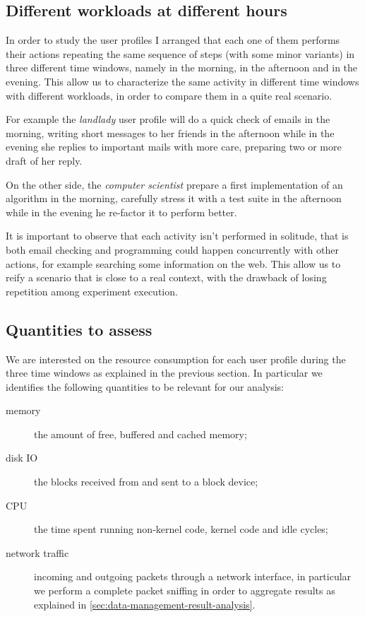 \documentclass[10pt,a4paper]{article}
\begin{document}
    \subsection{Different workloads at different hours}
    In order to study the user profiles I arranged that each one of
    them performs their actions repeating the same sequence of steps
    (with some minor variants) in three different time windows, namely
    in the morning, in the afternoon and in the evening. This allow us
    to characterize the same activity in different time windows with
    different workloads, in order to compare them in a quite real
    scenario.

    For example the \emph{landlady} user profile will do a quick check
    of emails in the morning, writing short messages to her friends in
    the afternoon while in the evening she replies to important mails
    with more care, preparing two or more draft of her reply.

    On the other side, the \emph{computer scientist} prepare a first
    implementation of an algorithm in the morning, carefully stress it
    with a test suite in the afternoon while in the evening he re-factor
    it to perform better.

    It is important to observe that each activity isn't performed in
    solitude, that is both email checking and programming could happen
    concurrently with other actions, for example searching some
    information on the web. This allow us to reify a scenario that is
    close to a real context, with the drawback of losing repetition
    among experiment execution.

    \subsection{Quantities to assess}
    We are interested on the resource consumption for each user
    profile during the three time windows as explained in the previous
    section. In particular we identifies the following quantities to
    be relevant for our analysis:
    \begin{description}
    \item[memory] the amount of free, buffered and cached memory;
    \item[disk IO] the blocks received from and sent to a block
      device;
    \item[CPU] the time spent running non-kernel code, kernel code and
      idle cycles;
    \item[network traffic] incoming and outgoing packets through a
      network interface, in particular we perform a complete packet
      sniffing in order to aggregate results as explained in
      \autoref{sec:data-management-result-analysis}.
    \end{description}
\end{document}
